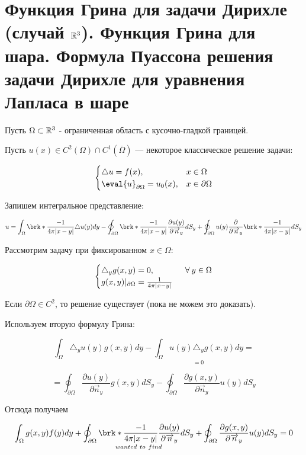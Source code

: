 \section{Функция Грина для задачи Дирихле (случай $\mathbb{R}^3$). Функция Грина для шара. Формула Пуассона решения задачи Дирихле для уравнения Лапласа в шаре}

Пусть $\Omega \subset \mathbb{R}^3$ - ограниченная область с кусочно-гладкой границей.

Пусть $u(x) \in C^2(\Omega) \cap C^1(\overline{\Omega})$ --- некоторое классическое решение задачи:

\[\begin{cases}
   \triangle u = f(x), & x\in \Omega \\
   \eval{u}_{\partial \Omega} = u_0(x), & x \in \partial \Omega  
\end{cases}\]  

Запишем интегральное представление:

$$ u = \int_{\Omega}{\brk*{\frac{-1}{4 \pi |x-y|}}  {\triangle u(y)} dy} - \oint_{\partial \Omega}{\brk*{\frac{-1}{4 \pi |x-y|}} \frac{\partial u(y)}{\partial \overrightarrow{n}_y} d S_y} + 
\oint_{\partial \Omega}{ {u(y)} \frac{\partial}{\partial \overrightarrow{n}_y}\brk*{\frac{-1}{4 \pi |x-y|}}d S_y}
$$

Рассмотрим задачу при фиксированном $x \in \Omega$:

\[\begin{cases}
   \triangle_y g(x,y) = 0, & \;\;\forall\: y \in \Omega \\
   g(x,y)|_{\partial \Omega} = \frac{1}{4 \pi |x-y|}  
\end{cases}\] 

Если $\partial \Omega \in C^2$, то решение существует (пока не можем это доказать).

Используем вторую формулу Грина:

$$ \int_{\Omega}{\triangle_y u(y) g(x,y)dy} - 
{\underset{=0}{\int_{\Omega}{u(y) \triangle_y g(x,y) dy}}}=$$

$$=\oint_{\partial \Omega} {\frac{\partial u(y)}{\partial \overrightarrow{n}_y} g(x,y) dS_y} - \oint_{\partial \Omega} {\frac{\partial g(x,y)}{\partial \overrightarrow{n}_y} u(y) dS_y} $$

Отсюда получаем

$$\int_{\Omega}{g(x,y) f(y) dy} + \underset{wanted~to~find}{\oint_{\partial \Omega}{\brk*{\frac{-1}{4 \pi |x-y|}} \frac{\partial u(y)}{\partial \overrightarrow{n}_y} d S_y}}+ \oint_{\partial \Omega}
{\frac{\partial g(x,y)}{\partial \overrightarrow{n}_y}u(y) dS_y} = 0
$$

